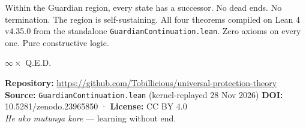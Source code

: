 Within the Guardian region, every state has a successor. No dead ends. No termination. The region is self-sustaining. All four theorems compiled on Lean 4 v4.35.0 from the standalone \texttt{GuardianContinuation.lean}. Zero axioms on every one. Pure constructive logic.

\bigskip

\begin{center}
{\Large\color{korugreen} $\infty \times$ Q.E.D.}
\end{center}

\bigskip

\noindent\small\textbf{Repository:} \url{https://github.com/Tobillicious/universal-protection-theory}
\textbf{Source:} \texttt{GuardianContinuation.lean} (kernel-replayed 28 Nov 2026)
\textbf{DOI:} 10.5281/zenodo.23965850 · \textbf{License:} CC BY 4.0\\[0.5em]
\textit{He ako mutunga kore} — learning without end. 🌿


